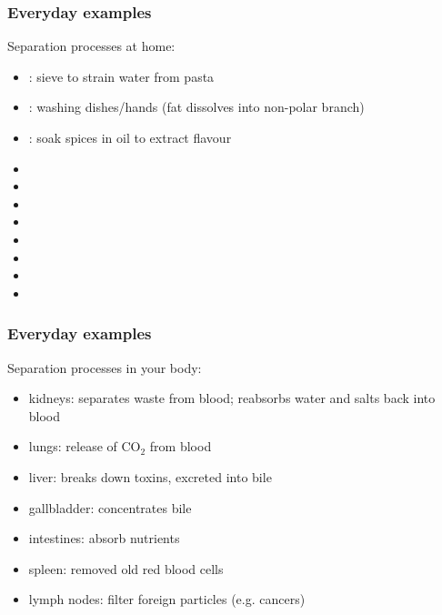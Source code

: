 \begin{frame}\frametitle{Everyday examples}
	Separation processes at home:
	\begin{itemize}
		\item	{\color{myGreen}{screening}}: sieve to strain water from pasta
		\item	{\color{myGreen}{absorption}}: washing dishes/hands {\scriptsize (fat dissolves into non-polar branch)}
		\item	{\color{myGreen}{liquid/liquid extraction}}: soak spices in oil to extract flavour 
		\item	\iftoggle{instructor}{\href{https://www.youtube.com/watch?v=QpXQpRYxUCY.mp4}{{\color{myGreen}{cyclone:}} vacuum cleaner}}{\href{https://www.youtube.com/watch?v=QpXQpRYxUCY.mp4}{cyclone:}}
		\item	\iftoggle{instructor}{{\color{myGreen}{filtering}}: vacuum cleaner; furnace filter}{{\color{myGreen}{filter}}:}		
		\item	\iftoggle{instructor}{{\color{myGreen}{leaching}}: coffee/espresso maker}{{\color{myGreen}{leaching}}:} %
		\item	\iftoggle{instructor}{{\color{myGreen}{leaching}}: making tea}{{\color{myGreen}{leaching}}:}
		\item	\iftoggle{instructor}{{\color{myGreen}{adsorption}}: water filter}{{\color{myGreen}{adsorption}}:}
		\item	\iftoggle{instructor}{{\color{myGreen}{centrifugation}}: clothes washing machine}{{\color{myGreen}{centrifugation}}:}
		\item	\iftoggle{instructor}{{\color{myGreen}{phase change by heat addition}}: clothes drier}{{\color{myGreen}{phase change by heat addition}}:}
		\item	\iftoggle{instructor}{{\color{myGreen}{phase change by heat removal}}: dehumidifier}{{\color{myGreen}{phase change by heat removal}}:}
	\end{itemize}
\end{frame}
	
\begin{frame}\frametitle{Everyday examples}
	Separation processes in your body:
	\begin{itemize}
		\item	kidneys: separates waste from blood; reabsorbs water and salts back into blood
		\item	lungs: release of $\text{CO}_2$ from blood
		\item	liver: breaks down toxins, excreted into bile
		\item	gallbladder: concentrates bile
		\item	intestines: absorb nutrients
		\item	spleen: removed old red blood cells
		\item	lymph nodes: filter foreign particles (e.g. cancers)
	\end{itemize}
\end{frame}

